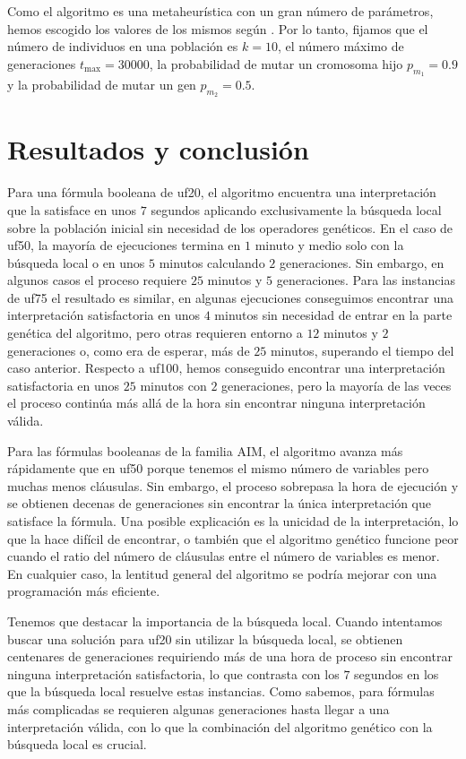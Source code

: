 \documentclass{article}
\theoremstyle{definition}
\newcommand{\cmtt}[1]{{\fontfamily{cmtt}\selectfont #1}}
\begin{document}
Como el algoritmo es una metaheurística con un gran número de parámetros, hemos escogido los valores de los mismos según \cite{MarRoss}. Por lo tanto, fijamos que el número de individuos en una población es $k=10$, el número máximo de generaciones $t_{\max} = 30000$, la probabilidad de mutar un cromosoma hijo $p_{m_1}=0.9$ y la probabilidad de mutar un gen $p_{m_2}=0.5$.
\section{Resultados y conclusión}\label{sec4}

Para una fórmula booleana de \cmtt{uf20}, el algoritmo encuentra una interpretación que la satisface en unos $7$ segundos aplicando exclusivamente la búsqueda local sobre la población inicial sin necesidad de los operadores genéticos. En el caso de \cmtt{uf50}, la mayoría de ejecuciones termina en $1$ minuto y medio solo con la búsqueda local o en unos $5$ minutos calculando $2$ generaciones. Sin embargo, en algunos casos el proceso requiere $25$ minutos y $5$ generaciones. Para las instancias de \cmtt{uf75} el resultado es similar, en algunas ejecuciones conseguimos encontrar una interpretación satisfactoria en unos $4$ minutos sin necesidad de entrar en la parte genética del algoritmo, pero otras requieren entorno a $12$ minutos y $2$ generaciones o, como era de esperar, más de $25$ minutos, superando el tiempo del caso anterior. Respecto a \cmtt{uf100}, hemos conseguido encontrar una interpretación satisfactoria en unos $25$ minutos con $2$ generaciones, pero la mayoría de las veces el proceso continúa más allá de la hora sin encontrar ninguna interpretación válida.

Para las fórmulas booleanas de la familia \cmtt{AIM}, el algoritmo avanza más rápidamente que en \cmtt{uf50} porque tenemos el mismo número de variables pero muchas menos cláusulas. Sin embargo, el proceso sobrepasa la hora de ejecución y se obtienen decenas de generaciones sin encontrar la única interpretación que satisface la fórmula. Una posible explicación es la unicidad de la interpretación, lo que la hace difícil de encontrar, o también que el algoritmo genético funcione peor cuando el ratio del número de cláusulas entre el número de variables es menor. En cualquier caso, la lentitud general del algoritmo se podría mejorar con una programación más eficiente.

Tenemos que destacar la importancia de la búsqueda local. Cuando intentamos buscar una solución para \cmtt{uf20} sin utilizar la búsqueda local, se obtienen centenares de generaciones requiriendo más de una hora de proceso sin encontrar ninguna interpretación satisfactoria, lo que contrasta con los $7$ segundos en los que la búsqueda local resuelve estas instancias. Como sabemos, para fórmulas más complicadas se requieren algunas generaciones hasta llegar a una interpretación válida, con lo que la combinación del algoritmo genético con la búsqueda local es crucial.
\end{document}
